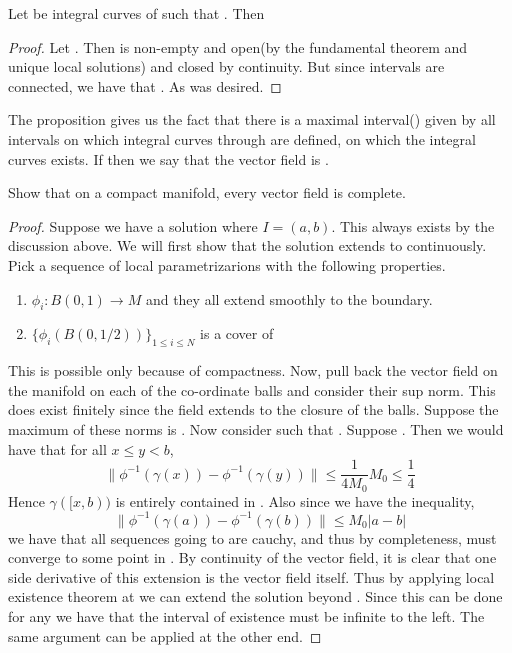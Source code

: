 \documentclass{article}
\begin{document}
\begin{proposition}
    Let  be integral curves of  such that . Then \mm{\gamma = \eta}
\end{proposition}
\begin{proof}
    Let . Then  is non-empty and open(by the fundamental theorem and unique local solutions) and closed by continuity.
    But since intervals are connected, we have that . As was desired.
\end{proof}

The proposition gives us the fact that there is a maximal interval() given by all intervals on which integral curves through  are defined, on which the integral curves exists.
If  then we say that the vector field  is .

\begin{exercise*}
    Show that on a compact manifold, every vector field is complete.
\end{exercise*}
\begin{proof}
    Suppose we have a solution  where $I=(a,b)$. This always exists by the discussion above. We will first show that the solution extends to  continuously.
    Pick a sequence of local parametrizarions  with the following properties.
    \begin{enumerate}
        \item $\phi_i:B(0,1)\to M$ and they all extend smoothly to the boundary.
        \item $\{\phi_i(B(0,1/2))\}_{1\leq i\leq N}$ is a cover of  
    \end{enumerate}
    This is possible only because of compactness. Now, pull back the vector field on the manifold on each of the co-ordinate balls and consider their sup norm.
    This does exist finitely since the field extends to the closure of the balls. Suppose the maximum of these norms is . Now consider  such that 
    . Suppose . Then we would have that for all $x\leq y<b$, $$\|\phi^{-1}(\gamma(x))-\phi^{-1}(\gamma(y))\|\leq \frac{1}{4M_0}M_0 \leq \frac{1}{4}$$
    Hence $\gamma([x,b))$ is entirely contained in . Also since we have the inequality, 
    $$\|\phi^{-1}(\gamma(a))-\phi^{-1}(\gamma(b))\|\leq M_0|a-b|$$ 
    we have that all sequences going to  are cauchy, and thus by completeness, must converge to some point in . By continuity of the vector field, it is clear that 
    one side derivative of this extension is the vector field itself. Thus by applying local existence theorem at  we can extend the solution beyond .
    Since this can be done for any  we have that the interval of existence must be infinite to the left. The same argument can be applied at the other end.
\end{proof}
\end{document}
